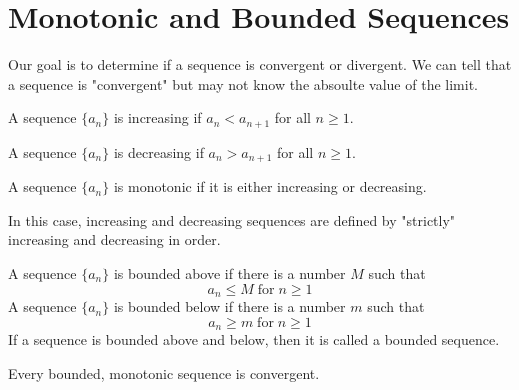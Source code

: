 \section{Monotonic and Bounded Sequences}

Our goal is to determine if a sequence is convergent or divergent. We can tell that a sequence is "convergent" but may not know the absoulte value of the limit.

\begin{definition}
  A sequence \(\{a_{n}\}\) is increasing if \(a_{n} < a_{n + 1}\) for all \(n \ge 1\).
\end{definition}

\begin{definition}
  A sequence \(\{a_{n}\}\) is decreasing if \(a_{n} > a_{n + 1}\) for all \(n \ge 1\).
\end{definition}

\begin{definition}
  A sequence \(\{a_{n}\}\) is monotonic if it is either increasing or decreasing.
\end{definition}

\begin{remark}
  In this case, increasing and decreasing sequences are defined by "strictly" increasing and decreasing in order.
\end{remark}

\begin{definition}
  A sequence \(\{a_{n}\}\) is bounded above if there is a number \(M\) such that
  \[
    a_{n} \le M \; \mathrm{for} \; n \ge 1
  \]
  A sequence \(\{a_{n}\}\) is bounded below if there is a number \(m\) such that
  \[
    a_{n} \ge m \; \mathrm{for} \; n \ge 1
  \]
  If a sequence is bounded above and below, then it is called a bounded sequence.
\end{definition}

\begin{theorem}
  Every bounded, monotonic sequence is convergent.
\end{theorem}


